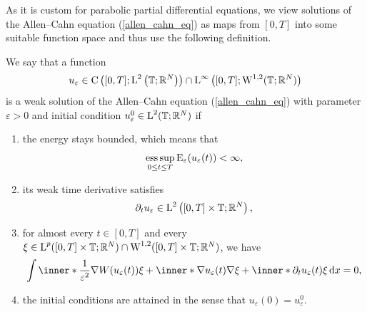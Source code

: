 As it is custom for parabolic partial differential equations, we view solutions 
of the Allen--Cahn equation (\ref{allen_cahn_eq}) as maps from $ [0,T] $ into 
some suitable function space and thus use the following definition.

\begin{definition}
	\label{solution_to_ac}
	We say that a function 
	\begin{equation*}
	u_{ \varepsilon} \in 
	\mathrm{ C } \left( [0 , T ] ; \operatorname{L}^{ 2 } \left( \operatorname{\mathbb{T}}; \mathbb{ R }^{ 
	N } \right) \right) \cap
	\operatorname{L}^{ \infty } \left( [0, T ]; \operatorname{W}^{ 1, 2 } ( \operatorname{\mathbb{T}} ; \mathbb{ R }^{ 
	N } ) \right)
	\end{equation*}
	is a weak solution of the Allen--Cahn equation (\ref{allen_cahn_eq}) with parameter $ \varepsilon > 0 $ and initial condition $ u_{ \varepsilon}^{ 0 } \in \operatorname{L}^{ 2 } ( \operatorname{\mathbb{T}} ; \mathbb{ R }^{ N } ) $ if
	\begin{enumerate}
		\item the energy stays bounded, which means that
		\begin{equation}
			\operatorname*{ess\,sup}_{ 0 \leq t \leq T }
			\operatorname{E}_{ \varepsilon } ( u_{ \varepsilon } ( t ) ) 
			< \infty,
		\end{equation}
		\item 
		its weak time derivative satisfies
		\begin{equation}
			\partial_{ t } u_{ \varepsilon }
			\in
			\operatorname{L}^{ 2 } \left( [ 0 , T ] \times \operatorname{\mathbb{T}} ; \mathbb{ R }^{ N } \right),
		\end{equation}
		\item 
		\label{here_appears_p}
		for almost every $ t \in [ 0 , T ] $ and every 
		$ \xi \in \operatorname{L}^{ p } ( [ 0 , T ] \times \operatorname{\mathbb{T}}; \mathbb{ R }^{ N } ) 
		\cap
		\operatorname{W}^{ 1, 2 } ( [ 0, T ] \times \operatorname{\mathbb{T}} ; \mathbb{ R }^{ N } ) $,
		we have
		\begin{equation}
			\label{ac_weak_equation}
			\int
			\inner*{ \frac{ 1 }{ \varepsilon^{ 2 } } \nabla W ( u_{ \varepsilon} ( t ) ) }{ \xi }
			+
			\inner*{ \nabla u_{ \varepsilon } ( t ) }{ \nabla \xi } 
			+
			\inner*{\partial_{ t } u_{ \varepsilon} ( t ) }{ \xi }
			\dd{x}
			=
			0,
		\end{equation}
		\item 
		the initial conditions are attained in the sense that $ u_{ \varepsilon 
		} ( 0 ) = u_{ \varepsilon}^{ 0 } $.
	\end{enumerate}
\end{definition}

